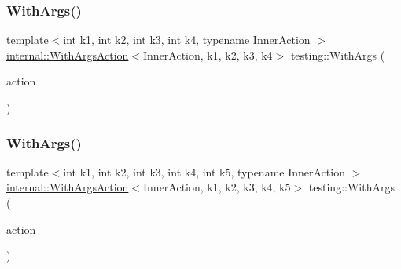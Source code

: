 \mbox{\label{namespacetesting_a646a2e4ac7866ee8c486cb167ba9b45e}} 
\subsubsection{\texorpdfstring{WithArgs()}{WithArgs()}\hspace{0.1cm}{\footnotesize\ttfamily [4/11]}}
{\footnotesize\ttfamily template$<$int k1, int k2, int k3, int k4, typename Inner\+Action $>$ \\
\mbox{\hyperlink{structtesting_1_1internal_1_1_with_args_action}{internal\+::\+With\+Args\+Action}}$<$Inner\+Action, k1, k2, k3, k4$>$ testing\+::\+With\+Args (\begin{DoxyParamCaption}\item[{const Inner\+Action \&}]{action }\end{DoxyParamCaption})\hspace{0.3cm}{\ttfamily [inline]}}

\mbox{\label{namespacetesting_aa36b0c7216df96bdacf9fe491afd40bd}} 
\subsubsection{\texorpdfstring{WithArgs()}{WithArgs()}\hspace{0.1cm}{\footnotesize\ttfamily [5/11]}}
{\footnotesize\ttfamily template$<$int k1, int k2, int k3, int k4, int k5, typename Inner\+Action $>$ \\
\mbox{\hyperlink{structtesting_1_1internal_1_1_with_args_action}{internal\+::\+With\+Args\+Action}}$<$Inner\+Action, k1, k2, k3, k4, k5$>$ testing\+::\+With\+Args (\begin{DoxyParamCaption}\item[{const Inner\+Action \&}]{action }\end{DoxyParamCaption})\hspace{0.3cm}{\ttfamily [inline]}}

\mbox{\label{namespacetesting_a6df9cd27659e5943b5d3d77fc4f102e3}} 
